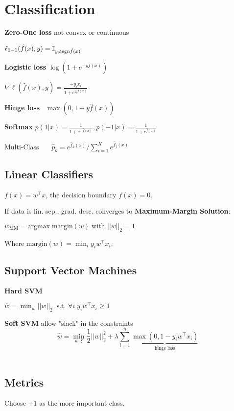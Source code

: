 \section*{Classification}

\textbf{Zero-One loss} \quad not convex or continuous

\qquad \qquad $\ell_{0-1}(\hat{f}(x), y) = \mathbb{I}_{y \neq \text{sgn} \hat{f}(x)}$

\textbf{Logistic loss} \quad $\log(1 + e^{-y \hat{f}(x)})$

\qquad \qquad $\nabla \ell(\hat{f}(x), y) = \frac{-y_i x_i}{1 + e^{y_i \hat{f}(x)}}$

\textbf{Hinge loss} \quad \ $\max(0, 1-y \hat{f}(x))$

\textbf{Softmax} $p(1 | x) = \frac{1}{1 + e^{- \hat{f}(x)}}, p(-1 | x) = \frac{1}{1 + e^{\hat{f}(x)}}$ 

Multi-Class \ \ \ $\hat{p}_k = e^{\hat{f}_k(x)} / \sum_{i=1}^K e^{\hat{f}_j(x)}$

\subsection*{Linear Classifiers}

$f(x) = w^\top x$, the decision boundary $f(x) = 0$. \smallskip

If data is lin. sep., grad. desc. converges to \textbf{Maximum-Margin Solution}: 

\quad $w_\text{MM} = \text{argmax} \; \text{margin} (w) \; \text{with } ||w||_2 = 1$

Where $\text{margin} (w) = \min_i y_i w^\top x_i$.
 
\subsection*{Support Vector Machines}
\textbf{Hard SVM}

\qquad $\hat{w} = \min_w ||w||_2 \; \; \text{s.t. } \forall i \;y_i w^\top x_i \geq 1$
 
\textbf{Soft SVM} \quad allow "slack" in the constraints
$$\hat{w} = \min_{w, \xi} \frac{1}{2} ||w||_2^2 + \lambda \sum_{i=1}^n \underbrace{\max (0, 1 - y_i w^\top x_i)}_{\text{hinge loss}}$$ \\[-23pt]

\subsection*{Metrics} 
Choose $+1$ as the more important class. \\[-18pt]

